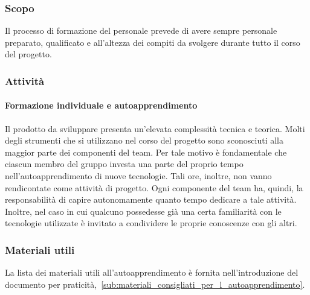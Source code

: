 \documentclass[../../norme-di-progetto.tex]{subfiles}
\begin{document}
\subsubsection{Scopo}%
\label{subs:formazione_del_personale/scopo}

Il processo di formazione del personale prevede di avere sempre personale preparato, qualificato e all'altezza dei compiti da svolgere durante tutto il corso del progetto.

\subsubsection{Attività}%
\label{subs:formazione_del_personale/attivita}

\paragraph{Formazione individuale e autoapprendimento}%
\label{par:formazione_individuale_e_autoapprendimento}

Il prodotto da sviluppare presenta un'elevata complessità tecnica e teorica.
Molti degli strumenti che si utilizzano nel corso del progetto sono sconosciuti alla maggior parte dei componenti del team.
Per tale motivo è fondamentale che ciascun membro del gruppo investa una parte del proprio tempo nell'autoapprendimento di nuove tecnologie.
Tali ore, inoltre, non vanno rendicontate come attività di progetto.
Ogni componente del team ha, quindi, la responsabilità di capire autonomamente quanto tempo dedicare a tale attività.
Inoltre, nel caso in cui qualcuno possedesse già una certa familiarità con le tecnologie utilizzate è invitato a condividere le proprie conoscenze con gli altri.

\subsubsection{Materiali utili}%
\label{subs:materiali_utili}

La lista dei materiali utili all'autoapprendimento è fornita nell'introduzione del documento per praticità,~\ref{sub:materiali_consigliati_per_l_autoapprendimento}.
\end{document}
